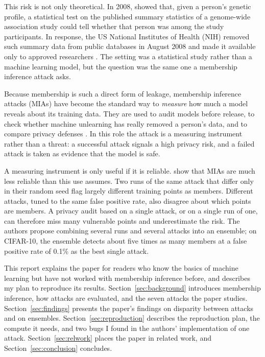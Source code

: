 \documentclass[a4paper]{article}
\begin{document}
This risk is not only theoretical.
In 2008, \citet{homer2008resolving} showed that, given a person's genetic profile, a statistical test on the published summary statistics of a genome-wide association study could tell whether that person was among the study participants.
In response, the US National Institutes of Health (NIH) removed such summary data from public databases in August 2008 and made it available only to approved researchers \citep{azbio2008forensic}.
The setting was a statistical study rather than a machine learning model, but the question was the same one a membership inference attack asks.

Because membership is such a direct form of leakage, membership inference attacks (MIAs) have become the standard way to \emph{measure} how much a model reveals about its training data.
They are used to audit models before release, to check whether machine unlearning has really removed a person's data, and to compare privacy defenses \citep{wang2025mia}.
In this role the attack is a measuring instrument rather than a threat: a successful attack signals a high privacy risk, and a failed attack is taken as evidence that the model is safe.

A measuring instrument is only useful if it is reliable.
\citet{wang2025mia} show that MIAs are much less reliable than this use assumes.
Two runs of the same attack that differ only in their random seed flag largely different training points as members.
Different attacks, tuned to the same false positive rate, also disagree about which points are members.
A privacy audit based on a single attack, or on a single run of one, can therefore miss many vulnerable points and underestimate the risk.
The authors propose combining several runs and several attacks into an ensemble; on CIFAR-10, the ensemble detects about five times as many members at a false positive rate of 0.1\% as the best single attack.

This report explains the paper for readers who know the basics of machine learning but have not worked with membership inference before, and describes my plan to reproduce its results.
Section~\ref{sec:background} introduces membership inference, how attacks are evaluated, and the seven attacks the paper studies.
Section~\ref{sec:findings} presents the paper's findings on disparity between attacks and on ensembles.
Section~\ref{sec:reproduction} describes the reproduction plan, the compute it needs, and two bugs I found in the authors' implementation of one attack.
Section~\ref{sec:relwork} places the paper in related work, and Section~\ref{sec:conclusion} concludes.
\end{document}

